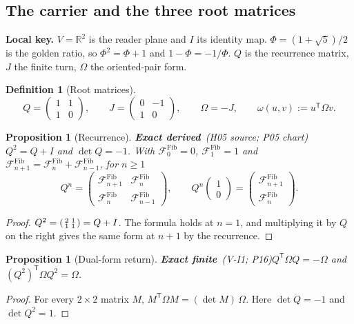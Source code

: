\documentclass[11pt,a4paper]{article}
\newcommand{\RR}{\mathbb{R}}\newcommand{\QQ}{\mathbb{Q}}\newcommand{\ZZ}{\mathbb{Z}}
\newcommand{\tp}{^{\mathsf T}}
\newcommand{\Fib}[1]{\mathcal{F}^{\mathrm{Fib}}_{#1}}\newcommand{\Luc}[1]{\mathcal{L}^{\mathrm{Luc}}_{#1}}
\newcommand{\st}[1]{\textsf{\small\textbf{#1}}}
\newcommand{\Sfin}{\st{Exact finite}}\newcommand{\Sder}{\st{Exact derived}}
\newcommand{\lkey}[1]{\par\noindent\textbf{Local key.} #1\par\smallskip}
\theoremstyle{plain}
\newtheorem{prop}[thm]{Proposition}
\theoremstyle{definition}
\newtheorem{defn}[thm]{Definition}
\theoremstyle{remark}
\begin{document}
\subsection{The carrier and the three root matrices}
\lkey{$V=\RR^2$ is the reader plane and $I$ its identity map. $\Phi=(1+\sqrt5)/2$ is the golden ratio, so $\Phi^2=\Phi+1$ and $1-\Phi=-1/\Phi$. $Q$ is the recurrence matrix, $J$ the finite turn, $\Omega$ the oriented-pair form.}
\begin{defn}[Root matrices]
\[
Q=\begin{pmatrix}1&1\\1&0\end{pmatrix},\qquad J=\begin{pmatrix}0&-1\\1&0\end{pmatrix},\qquad \Omega=-J,\qquad \omega(u,v):=u\tp\Omega v.
\]
\end{defn}
\begin{prop}[Recurrence]\Sder\ \textit{(H05 source; P05 chart)}\label{prop:rec}
$Q^2=Q+I$ and $\det Q=-1$. With $\Fib0=0$, $\Fib1=1$ and $\Fib{n+1}=\Fib n+\Fib{n-1}$, for $n\ge1$
\[
Q^n=\begin{pmatrix}\Fib{n+1}&\Fib n\\\Fib n&\Fib{n-1}\end{pmatrix},\qquad Q^n\begin{pmatrix}1\\0\end{pmatrix}=\begin{pmatrix}\Fib{n+1}\\\Fib n\end{pmatrix}.
\]
\end{prop}
\begin{proof}
$Q^2=\begin{psmallmatrix}2&1\\1&1\end{psmallmatrix}=Q+I$. The formula holds at $n=1$, and multiplying it by $Q$ on the right gives the same form at $n+1$ by the recurrence.
\end{proof}
\begin{prop}[Dual-form return]\Sfin\ \textit{(V-I1; P16)}\label{prop:dual}
$Q\tp\Omega Q=-\Omega$ and $(Q^2)\tp\Omega Q^2=\Omega$.
\end{prop}
\begin{proof}
For every $2\times2$ matrix $M$, $M\tp\Omega M=(\det M)\,\Omega$. Here $\det Q=-1$ and $\det Q^2=1$.
\end{proof}
\end{document}
